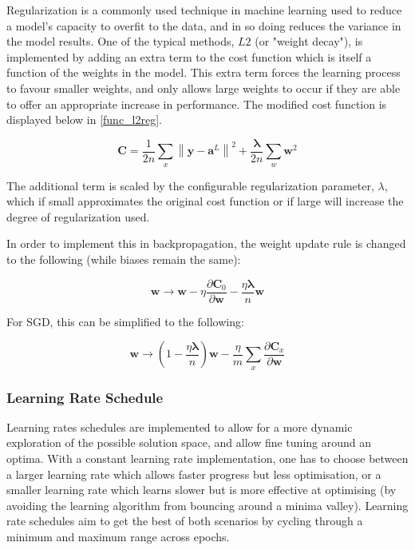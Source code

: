 \documentclass[a4paper,11pt,oneside]{article}
\theoremstyle{plain}
\theoremstyle{definition}
\begin{document}
Regularization is a commonly used technique in machine learning used to reduce a model's capacity to overfit to the data, and in so doing reduces the variance in the model results. One of the typical methods, $L2$ (or "weight decay"), is implemented by adding an extra term to the cost function which is itself a function of the weights in the model. This extra term forces the learning process to favour smaller weights, and only allows large weights to occur if they are able to offer an appropriate increase in performance. The modified cost function is displayed below in \ref{func_l2reg}.

\begin{equation}\label{func_l2reg}
\mathbf{C}=\frac{1}{2 n} \sum_{x}\left\|\mathbf{y}-\mathbf{a}^{L}\right\|^{2}+\frac{\mathbf{\lambda}}{2 n} \sum_{w} \mathbf{w}^{2}
\end{equation}

The additional term is scaled by the configurable regularization parameter, $\lambda$, which if small approximates the original cost function or if large will increase the degree of regularization used. \newline

In order to implement this in backpropagation, the weight update rule is changed to the following (while biases remain the same):

\begin{equation}\label{func_l2_weight_update}
\mathbf{w} \rightarrow \mathbf{w}-\eta \frac{\partial \mathbf{C}_{0}}{\partial \mathbf{w}}-\frac{\eta \mathbf{\lambda}}{n} \mathbf{w}
\end{equation}

For SGD, this can be simplified to the following: 

\begin{equation}\label{func_sgd_l2}
\mathbf{w} \rightarrow\left(1-\frac{\eta \mathbf{\lambda}}{n}\right) \mathbf{w}-\frac{\eta}{m} \sum_{x} \frac{\partial \mathbf{C}_{x}}{\partial \mathbf{w}}
\end{equation}


\subsubsection{Learning Rate Schedule}\label{imp_learning_rate_schedule}

Learning rates schedules are implemented to allow for a more dynamic exploration of the possible solution space, and allow fine tuning around an optima. With a constant learning rate implementation, one has to choose between a larger learning rate which allows faster progress but less optimisation, or a smaller learning rate which learns slower but is more effective at optimising (by avoiding the learning algorithm from bouncing around a minima valley). Learning rate schedules aim to get the best of both scenarios by cycling through a minimum and maximum range across epochs.\newline
\end{document}
